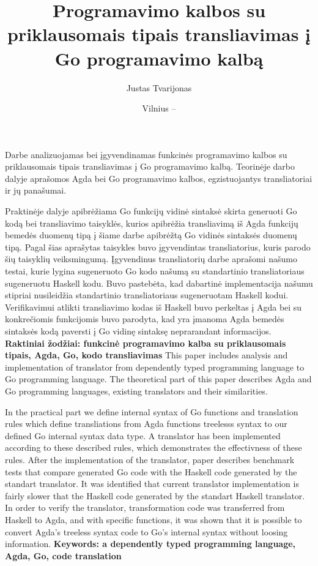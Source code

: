 \documentclass{VUMIFPSkursinis}
\title{Programavimo kalbos su priklausomais tipais transliavimas į Go programavimo kalbą}
\author{Justas Tvarijonas}
\date{Vilnius – \the\year}
\begin{document}
\maketitle

Darbe analizuojamas bei įgyvendinamas funkcinės programavimo kalbos su priklausomais tipais transliavimas į Go programavimo kalbą. Teorinėje darbo dalyje aprašomos Agda bei Go programavimo kalbos, egzistuojantys transliatoriai ir jų panašumai. 
\par Praktinėje dalyje apibrėžiama Go funkcijų vidinė sintaksė skirta generuoti Go kodą bei transliavimo taisyklės, kurios apibrėžia transliavimą iš Agda funkcijų bemedės duomenų tipą į šiame darbe apibrėžtą Go vidinės sintaksės duomenų tipą. Pagal šias aprašytas taisykles buvo įgyvendintas transliatorius, kuris parodo šių taisyklių veiksmingumą. Įgyvendinus transliatorių darbe aprašomi našumo testai, kurie lygina sugeneruoto Go kodo našumą su standartinio transliatoriaus sugeneruotu Haskell kodu. Buvo pastebėta, kad dabartinė implementacija našumu stipriai nusileidžia standartinio transliatoriaus sugeneruotam Haskell kodui. Verifikavimui atlikti transliavimo kodas iš Haskell buvo perkeltas į Agda bei su konkrečiomis funkcijomis buvo parodyta, kad yra įmanoma Agda bemedės sintaksės kodą paversti į Go vidinę sintaksę neprarandant informacijos.
\newline
\textbf{Raktiniai žodžiai: funkcinė programavimo kalba su priklausomais tipais, Agda, Go, kodo transliavimas}
This paper includes analysis and implementation of translator from dependently typed programming language to Go programming language. The theoretical part of this paper describes Agda and Go programming languages, existing translators and their similarities. 
\par In the practical part we define internal syntax of Go functions and translation rules which define transliations from Agda functions treelesss syntax to our defined Go internal syntax data type. A translator has been implemented according to these described rules, which demonstrates the effectivness of these rules. After the implementation of the translator, paper describes benchmark tests that compare generated Go code with the Haskell code generated by the standart translator. It was identified that current translator implementation is fairly slower that the Haskell code generated by the standart Haskell translator. In order to verify the translator, transformation code was transferred from Haskell to Agda, and with specific functions, it was shown that it is possible to convert Agda's treeless syntax code to Go's internal syntax without loosing information.
\newline
\textbf{Keywords: a dependently typed programming language, Agda, Go, code translation}
\end{document}
